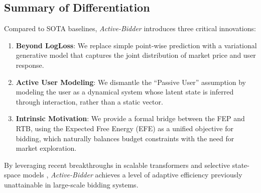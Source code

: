 \subsection{Summary of Differentiation}
Compared to SOTA baselines, \textit{Active-Bidder} introduces three critical innovations:
\begin{enumerate}
    \item \textbf{Beyond LogLoss}: We replace simple point-wise prediction with a variational generative model that captures the joint distribution of market price and user response.
    \item \textbf{Active User Modeling}: We dismantle the ``Passive User'' assumption by modeling the user as a dynamical system whose latent state is inferred through interaction, rather than a static vector.
    \item \textbf{Intrinsic Motivation}: We provide a formal bridge between the FEP and RTB, using the Expected Free Energy (EFE) as a unified objective for bidding, which naturally balances budget constraints with the need for market exploration.
\end{enumerate}
By leveraging recent breakthroughs in scalable transformers \citep{dao2023flashattention} and selective state-space models \citep{gu2023mamba}, \textit{Active-Bidder} achieves a level of adaptive efficiency previously unattainable in large-scale bidding systems.